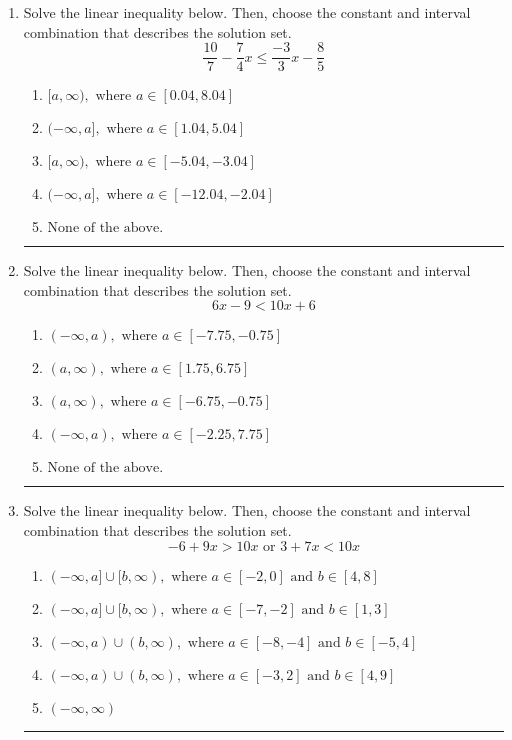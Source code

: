 \documentclass[14pt]{extbook}
\newcommand{\litem}[1]{\item#1\hspace*{-1cm}\rule{\textwidth}{0.4pt}}
\begin{document}
\begin{enumerate}
{\begin{enumerate}[label=\Alph*.]
\end{enumerate} }
\litem{
Solve the linear inequality below. Then, choose the constant and interval combination that describes the solution set.\[ \frac{10}{7} - \frac{7}{4} x \leq \frac{-3}{3} x - \frac{8}{5} \]\begin{enumerate}[label=\Alph*.]
\item \( [a, \infty), \text{ where } a \in [0.04, 8.04] \)
\item \( (-\infty, a], \text{ where } a \in [1.04, 5.04] \)
\item \( [a, \infty), \text{ where } a \in [-5.04, -3.04] \)
\item \( (-\infty, a], \text{ where } a \in [-12.04, -2.04] \)
\item \( \text{None of the above}. \)

\end{enumerate} }
\litem{
Solve the linear inequality below. Then, choose the constant and interval combination that describes the solution set.\[ 6x -9 < 10x + 6 \]\begin{enumerate}[label=\Alph*.]
\item \( (-\infty, a), \text{ where } a \in [-7.75, -0.75] \)
\item \( (a, \infty), \text{ where } a \in [1.75, 6.75] \)
\item \( (a, \infty), \text{ where } a \in [-6.75, -0.75] \)
\item \( (-\infty, a), \text{ where } a \in [-2.25, 7.75] \)
\item \( \text{None of the above}. \)

\end{enumerate} }
\litem{
Solve the linear inequality below. Then, choose the constant and interval combination that describes the solution set.\[ -6 + 9 x > 10 x \text{ or } 3 + 7 x < 10 x \]\begin{enumerate}[label=\Alph*.]
\item \( (-\infty, a] \cup [b, \infty), \text{ where } a \in [-2, 0] \text{ and } b \in [4, 8] \)
\item \( (-\infty, a] \cup [b, \infty), \text{ where } a \in [-7, -2] \text{ and } b \in [1, 3] \)
\item \( (-\infty, a) \cup (b, \infty), \text{ where } a \in [-8, -4] \text{ and } b \in [-5, 4] \)
\item \( (-\infty, a) \cup (b, \infty), \text{ where } a \in [-3, 2] \text{ and } b \in [4, 9] \)
\item \( (-\infty, \infty) \)


\end{enumerate}}
\end{enumerate}
\end{document}
